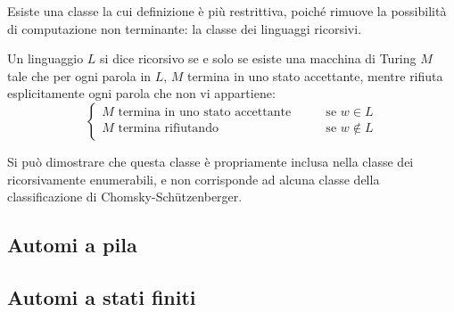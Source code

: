 Esiste una classe la cui definizione è più restrittiva, poiché rimuove la possibilità di computazione non terminante: la classe dei linguaggi ricorsivi.
\begin{defin}
	Un linguaggio $L$ si dice ricorsivo se e solo se esiste una macchina di Turing $M$ tale che per ogni parola in $L$, $M$ termina in uno stato accettante, mentre rifiuta esplicitamente ogni parola che non vi appartiene:
	\begin{equation*}
		\begin{cases}
			\text{$M$ termina in uno stato accettante} \qquad&\text{se } w\in L \\
			\text{$M$ termina rifiutando} \qquad&\text{se } w\notin L
		\end{cases}
	\end{equation*}
\end{defin}
Si può dimostrare che questa classe è propriamente inclusa nella classe dei ricorsivamente enumerabili, e non corrisponde ad alcuna classe della classificazione di Chomsky-Schützenberger.



\subsection{Automi a pila}


\subsection{Automi a stati finiti}

